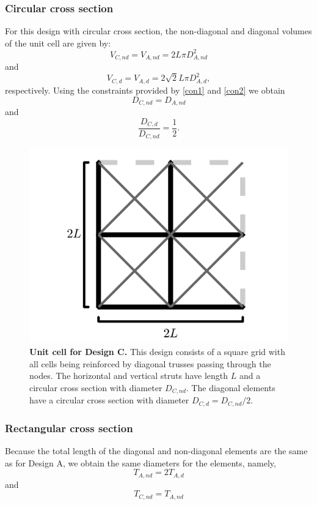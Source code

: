 \documentclass[10pt,twoside]{fernandes_supp}
\begin{document}
\subsubsection{Circular cross section}
For this design with circular cross section, the non-diagonal and diagonal volumes of the unit cell are given by:
\begin{equation}
V_{C,nd}=V_{A,nd}=2 L \pi D^2_{A,nd}
\end{equation}
and
\begin{equation}
V_{C,d}=V_{A,d}=2\sqrt{2}L \pi D^2_{A,d},
\end{equation}
respectively.
Using the constraints provided by \cref{con1} and \cref{con2} we  obtain 
\begin{equation}
{{D}_{C,nd}}={{D}_{A,nd}}
\end{equation}
and
\begin{equation}
\frac{{D}_{C,d}}{{D}_{C,nd}}=\frac{1}{2}.
\end{equation}

\begin{figure}[H]
    \centering
    \includegraphics[width=0.4\linewidth]{SFig4.png}
    \caption{{\bf Unit cell for Design C.} This design consists of a square grid with all cells being reinforced by diagonal trusses passing through the nodes.  The horizontal and vertical struts have length $L$ and a circular cross section with diameter $D_{C,nd}$. The diagonal elements have a circular cross section  with diameter $D_{C,d}={D_{C,nd}}/{2}$.}
    \label{DesignC}
\end{figure}

\subsubsection{Rectangular cross section}
Because the total length of the diagonal and non-diagonal elements are the same as for Design A, we obtain the same diameters for the elements, namely,
\begin{equation}
T_{A,nd}=2T_{A,d}
\end{equation}
and
\begin{equation}
T_{C,nd}=T_{A,nd}
\end{equation}
\end{document}
